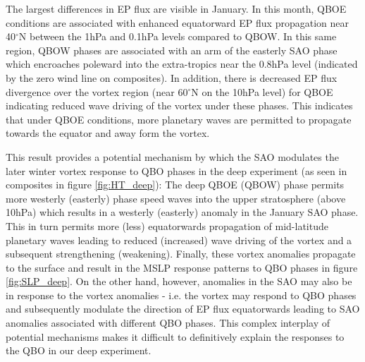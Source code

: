The largest differences in EP flux are visible in January. In this month, QBOE conditions are associated with enhanced equatorward EP flux propagation near 40$^\circ$N between the 1hPa and 0.1hPa levels compared to QBOW. In this same region, QBOW phases are associated with an arm of the easterly SAO phase which encroaches poleward into the extra-tropics near the 0.8hPa level (indicated by the zero wind line on composites). In addition, there is decreased EP flux divergence over the vortex region (near 60$^\circ$N on the 10hPa level) for QBOE indicating reduced wave driving of the vortex under these phases. This indicates that under QBOE conditions, more planetary waves are permitted to propagate towards the equator and away form the vortex.

This result provides a potential mechanism by which the SAO modulates the later winter vortex response to QBO phases in the deep experiment (as seen in composites in figure \ref{fig:HT_deep}): The deep QBOE (QBOW) phase permits more westerly (easterly) phase speed waves into the upper stratosphere (above 10hPa) which results in a westerly (easterly) anomaly in the January SAO phase. This in turn permits more (less) equatorwards propagation of mid-latitude planetary waves leading to reduced (increased) wave driving of the vortex and a subsequent strengthening (weakening). Finally, these vortex anomalies propagate to the surface and result in the MSLP response patterns to QBO phases in figure \ref{fig:SLP_deep}. On the other hand, however, anomalies in the SAO may also be in response to the vortex anomalies - i.e. the vortex may respond to QBO phases and subsequently modulate the direction of EP flux equatorwards leading to SAO anomalies associated with different QBO phases. This complex interplay of potential mechanisms makes it difficult to definitively explain the responses to the QBO in our deep experiment. 

